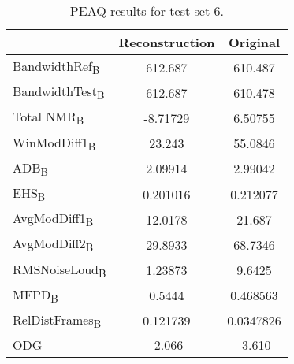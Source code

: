 \begin{table}\begin{center} %
\caption{PEAQ results for test set 6.}
\label{tab:PEAQdata1}
\begin{tabular}{|l|c|c|}
  \hline
                                    & Reconstruction & Original \\ \hline
  BandwidthRef\textsubscript{B}     & 612.687        & 610.487  \\
  BandwidthTest\textsubscript{B}    & 612.687        & 610.478  \\
  Total NMR\textsubscript{B}        & -8.71729       & 6.50755  \\
  WinModDiff1\textsubscript{B}      & 23.243         & 55.0846  \\
  ADB\textsubscript{B}              & 2.09914        & 2.99042  \\
  EHS\textsubscript{B}              & 0.201016       & 0.212077 \\
  AvgModDiff1\textsubscript{B}      & 12.0178        & 21.687   \\
  AvgModDiff2\textsubscript{B}      & 29.8933        & 68.7346  \\
  RMSNoiseLoud\textsubscript{B}     & 1.23873        & 9.6425   \\
  MFPD\textsubscript{B}             & 0.5444         & 0.468563 \\
  RelDistFrames\textsubscript{B}    & 0.121739       & 0.0347826\\
  ODG                               & -2.066         & -3.610   \\
  \hline
\end{tabular}
\end{center}\end{table}


